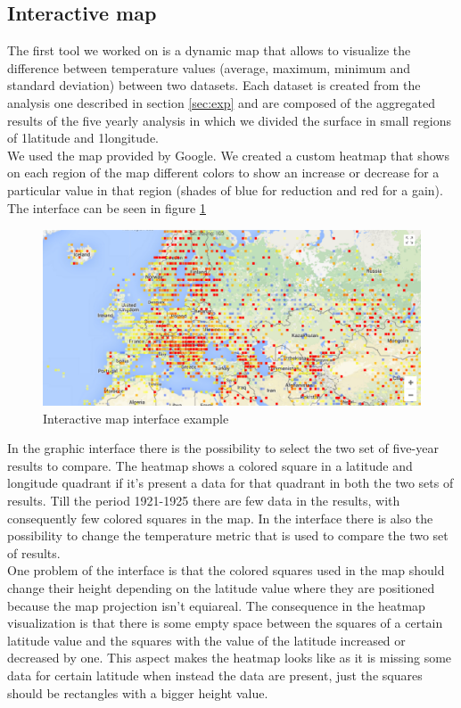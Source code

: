 \documentclass{vldb}
\begin{document}
\subsection{Interactive map}
\label{sec:map}
The first tool we worked on is a dynamic map that allows to visualize the difference between temperature values (average, maximum, minimum and standard deviation) between two datasets. Each dataset is created from the analysis one described in section \ref{sec:exp} and are composed of the aggregated results of the five yearly analysis in which we divided the surface in small regions of 1\degree latitude and 1\degree longitude. \\
We used the map provided by Google\cite{maps}. We created a custom heatmap that shows on each region of the map different colors to show an increase or decrease for a particular value in that region (shades of blue for reduction and red for a gain). The interface can be seen in figure \ref{fig:interface}

\begin{figure}[tbh]
\includegraphics[width=1\linewidth]{interface}
\caption{Interactive map interface example}
\label{fig:interface}
\end{figure}

In the graphic interface there is the possibility to select the two set of five-year results to compare. The heatmap shows a colored square in a latitude and longitude quadrant if it's present a data for that quadrant in both the two sets of results. Till the period 1921-1925 there are few data in the results, with consequently few colored squares in the map. In the interface there is also the possibility to change the temperature metric that is used to compare the two set of results.\\
One problem of the interface is that the colored squares used in the map should change their height depending on the latitude value where they are positioned because the map projection isn't equiareal. The consequence in the heatmap visualization is that there is some empty space between the squares of a certain latitude value and the squares with the value of the latitude increased or decreased by one. This aspect makes the heatmap looks like as it is missing some data for certain latitude when instead the data are present, just the squares should be rectangles with a bigger height value.\\
\end{document}
